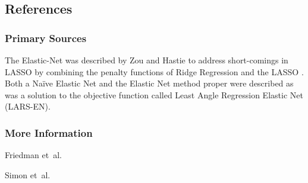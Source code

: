 

\subsection{References}

\subsubsection{Primary Sources}
The Elastic-Net was described by Zou and Hastie to address short-comings in LASSO by combining the penalty functions of Ridge Regression and the LASSO \cite{Zou2005}. Both a Na\"ive Elastic Net and the Elastic Net method proper were described as was a solution to the objective function called Least Angle Regression Elastic Net (LARS-EN).

\subsubsection{More Information}
Friedman et~al.\ \cite{Friedman2010}

Simon et~al.\ \cite{Simon2011}


